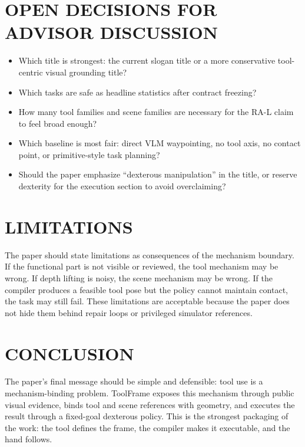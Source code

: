 \documentclass[letterpaper, 10 pt, conference]{ieeeconf}
\newcommand{\method}{ToolFrame}
\begin{document}
\section{OPEN DECISIONS FOR ADVISOR DISCUSSION}

\begin{itemize}
  \item Which title is strongest: the current slogan title or a more
  conservative tool-centric visual grounding title?
  \item Which tasks are safe as headline statistics after contract freezing?
  \item How many tool families and scene families are necessary for the RA-L
  claim to feel broad enough?
  \item Which baseline is most fair: direct VLM waypointing, no tool axis, no
  contact point, or primitive-style task planning?
  \item Should the paper emphasize ``dexterous manipulation'' in the title, or
  reserve dexterity for the execution section to avoid overclaiming?
\end{itemize}

\section{LIMITATIONS}

The paper should state limitations as consequences of the mechanism boundary.
If the functional part is not visible or reviewed, the tool mechanism may be
wrong. If depth lifting is noisy, the scene mechanism may be wrong. If the
compiler produces a feasible tool pose but the policy cannot maintain contact,
the task may still fail. These limitations are acceptable because the paper
does not hide them behind repair loops or privileged simulator references.

\section{CONCLUSION}

The paper's final message should be simple and defensible: tool use is a
mechanism-binding problem. \method{} exposes this mechanism through public
visual evidence, binds tool and scene references with geometry, and executes
the result through a fixed-goal dexterous policy. This is the strongest
packaging of the work: the tool defines the frame, the compiler makes it
executable, and the hand follows.



\end{document}
